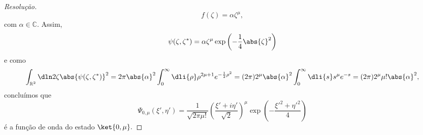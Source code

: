 \begin{proof}[Resolução]
   \begin{equation*}
       f(\zeta) = \alpha \zeta^\mu,
   \end{equation*}
   com \(\alpha \in \mathbb{C}.\) Assim, 
   \begin{equation*}
      \psi(\zeta, \zeta^*) = \alpha \zeta^\mu \exp\left(-\frac14 \abs{\zeta}^2\right)
   \end{equation*}
   e como
   \begin{equation*}
      \int_{\mathbb{R}^2} \dln2{\zeta} \abs{\psi(\zeta, \zeta^*)}^2 = 2\pi\abs{\alpha}^2\int_{0}^\infty \dli{\rho} \rho^{2\mu+1} e^{-\frac12\rho^2} = (2\pi) 2^\mu \abs{\alpha}^2\int_0^{\infty} \dli{s} s^{\mu} e^{-s} = (2\pi) 2^\mu \mu! \abs{\alpha}^2,
   \end{equation*}
   concluímos que
   \begin{equation*}
      \Psi_{0,\mu}(\xi', \eta') = \frac{1}{\sqrt{2\pi \mu!}} \left(\frac{\xi' + i \eta'}{\sqrt{2}}\right)^\mu \exp\left(-\frac{{\xi'}^2 + {\eta'}^2}{4}\right)
   \end{equation*}
   é a função de onda do estado \(\ket{0,\mu}.\)
\end{proof}

